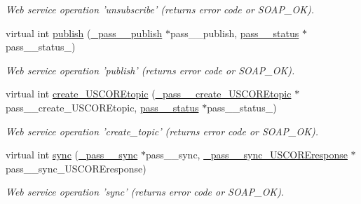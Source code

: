 \begin{DoxyCompactItemize}
\begin{DoxyCompactList}\small\item\em Web service operation 'unsubscribe' (returns error code or SOAP\_\-OK). \item\end{DoxyCompactList}\item 
\hypertarget{classPASSPortBindingService_a365892ac339950b70fea3b928d77901e}{
virtual int \hyperlink{classPASSPortBindingService_a365892ac339950b70fea3b928d77901e}{publish} (\hyperlink{class__pass____publish}{\_\-pass\_\-\_\-publish} $\ast$pass\_\-\_\-publish, \hyperlink{classpass____status}{pass\_\-\_\-status} $\ast$pass\_\-\_\-status\_\-)}
\label{classPASSPortBindingService_a365892ac339950b70fea3b928d77901e}

\begin{DoxyCompactList}\small\item\em Web service operation 'publish' (returns error code or SOAP\_\-OK). \item\end{DoxyCompactList}\item 
\hypertarget{classPASSPortBindingService_a577403d8479bc9c66e9d69b46eed0402}{
virtual int \hyperlink{classPASSPortBindingService_a577403d8479bc9c66e9d69b46eed0402}{create\_\-USCOREtopic} (\hyperlink{class__pass____create__USCOREtopic}{\_\-pass\_\-\_\-create\_\-USCOREtopic} $\ast$pass\_\-\_\-create\_\-USCOREtopic, \hyperlink{classpass____status}{pass\_\-\_\-status} $\ast$pass\_\-\_\-status\_\-)}
\label{classPASSPortBindingService_a577403d8479bc9c66e9d69b46eed0402}

\begin{DoxyCompactList}\small\item\em Web service operation 'create\_\-topic' (returns error code or SOAP\_\-OK). \item\end{DoxyCompactList}\item 
\hypertarget{classPASSPortBindingService_a896e1dfebdf0ccfa07fe193b24440bf0}{
virtual int \hyperlink{classPASSPortBindingService_a896e1dfebdf0ccfa07fe193b24440bf0}{sync} (\hyperlink{class__pass____sync}{\_\-pass\_\-\_\-sync} $\ast$pass\_\-\_\-sync, \hyperlink{class__pass____sync__USCOREresponse}{\_\-pass\_\-\_\-sync\_\-USCOREresponse} $\ast$pass\_\-\_\-sync\_\-USCOREresponse)}
\label{classPASSPortBindingService_a896e1dfebdf0ccfa07fe193b24440bf0}

\begin{DoxyCompactList}\small\item\em Web service operation 'sync' (returns error code or SOAP\_\-OK). \item\end{DoxyCompactList}\end{DoxyCompactItemize}


